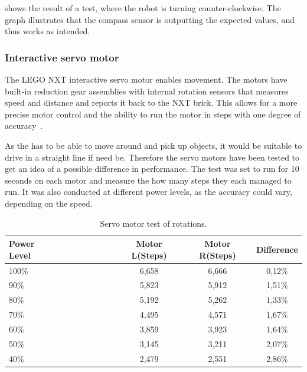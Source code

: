  shows the result of a test, where the robot is turning counter-clockwise. The graph illustrates that the compass sensor is outputting the expected values, and thus works as intended. 

\subsubsection{Interactive servo motor} \label{sec:servo_motor}
The LEGO NXT interactive servo motor enables movement. The motors have built-in reduction gear assemblies with internal rotation sensors that measures speed and distance and reports it back to the NXT brick. This allows for a more precise motor control and the ability to run the motor in steps with one degree of accuracy~\citep{lego_education}.

As the \projname{} has to be able to move around and pick up objects, it would be suitable to drive in a straight line if need be. Therefore the servo motors have been tested to get an idea of a possible difference in performance. The test was set to run for 10 seconds on each motor and measure the how many steps they each managed to run. It was also conducted at different power levels, as the accuracy could vary, depending on the speed. 

\begin{table}[H]
	\centering
    \begin{tabular}{lccc}
    \hline  
    \rowcolor{DGray}
    \textbf{Power Level}~~~~~~~~~~~~ & Motor L(Steps) & Motor R(Steps) & Difference \\ \hline 
    100\%                  & 6,658                  & 6,666                & 0,12\% \\
    90\%                   & 5,823                  & 5,912                & 1,51\% \\
    80\%                   & 5,192                  & 5,262                & 1,33\% \\
    70\%                   & 4,495                  & 4,571                & 1,67\% \\
    60\%                   & 3,859                  & 3,923                & 1,64\% \\
    50\%                   & 3,145                  & 3,211                & 2,07\% \\
    40\%                   & 2,479                  & 2,551                & 2,86\% \\
    \hline 
    \end{tabular}
    \caption{\label{table:servo_motor_test} Servo motor test of rotations.}
\end{table}

